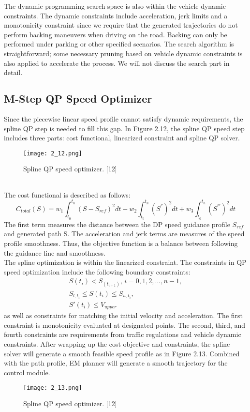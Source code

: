 \documentclass{report}
\begin{document}
\indent
The dynamic programming search space is also
within the vehicle dynamic constraints. The dynamic constraints include acceleration, jerk limits and a monotonicity constraint since we require that the generated trajectories do not perform backing maneuvers when driving on the road. Backing can only be performed under parking or other specified scenarios. The search algorithm is straightforward; some necessary pruning based on vehicle dynamic constraints is also applied to accelerate the process. We will not discuss the search part in detail.

\subsection{M-Step QP Speed Optimizer}
Since the piecewise linear speed profile cannot satisfy dynamic requirements, the spline QP step is needed to fill this gap. In Figure 2.12, the spline QP speed step includes three parts: cost functional, linearized constraint and spline QP solver.
 \begin{figure}[ht]
	\centering
	\texttt{[image: 2\_12.png]}
	\caption{Spline QP speed optimizer. [12]}
	\label{fig:2.12} 
\end{figure}\\
\indent
The cost functional is described as follows:
\begin{equation}
C_{total}(S) = w_1 \int_{t_0}^{t_n} (S - S_{ref})^2dt + w_2 \int_{t_0}^{t_n}(S^{''})^2dt + w_3 \int_{t_0}^{t_n} (S^{'''})^2dt 
\end{equation}
The first term measures the distance between the DP speed guidance profile $S_{ref}$ and generated path S. The acceleration and jerk terms are measures of the speed profile smoothness. Thus, the objective function is a balance between following the guidance line and smoothness.\\
\indent
The spline optimization is within the linearized constraint. The constraints in QP speed optimization include the following boundary constraints:
\begin{equation}
 \begin{array}{cl}
 S(t_i) < S_(t_{i+1}), \, i=0,1,2,..., n-1,\\
 S_{l,t_i} \leq S(t_i) \leq S_{u,t_i},\\
 S'(t_i) \leq V_{upper}

 \end{array}
\end{equation}
as well as constraints for matching the initial velocity and acceleration. The first constraint is monotonicity evaluated at designated points. The second, third, and fourth constraints are requirements from traffic regulations and vehicle dynamic constraints. After wrapping up the cost objective and constraints, the spline solver will generate a smooth feasible speed profile as in Figure 2.13. Combined with the path profile, EM planner will generate a smooth trajectory for the control module.
\begin{figure}[ht]
	\centering
	\texttt{[image: 2\_13.png]}
	\caption{Spline QP speed optimizer. [12]}
	\label{fig:2.13} 
\end{figure}
\end{document}
